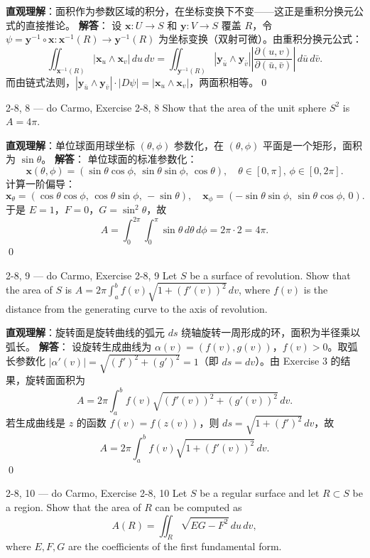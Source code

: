 \begin{solution}
\textbf{直观理解}：面积作为参数区域的积分，在坐标变换下不变——这正是重积分换元公式的直接推论。
\textbf{解答}：
设 $\mathbf{x}: U \to S$ 和 $\mathbf{y}: V \to S$ 覆盖 $R$，令 $\psi = \mathbf{y}^{-1} \circ \mathbf{x}: \mathbf{x}^{-1}(R) \to \mathbf{y}^{-1}(R)$ 为坐标变换（双射可微）。由重积分换元公式：
\[
\iint_{\mathbf{x}^{-1}(R)} |\mathbf{x}_u \wedge \mathbf{x}_v| \, du \, dv = \iint_{\mathbf{y}^{-1}(R)} |\mathbf{y}_{\bar{u}} \wedge \mathbf{y}_{\bar{v}}| \left|\frac{\partial(u,v)}{\partial(\bar{u},\bar{v})}\right| \, d\bar{u} \, d\bar{v}.
\]
而由链式法则，$|\mathbf{y}_{\bar{u}} \wedge \mathbf{y}_{\bar{v}}| \cdot |D\psi| = |\mathbf{x}_u \wedge \mathbf{x}_v|$，两面积相等。\qed
\end{solution}
\begin{exercise}
{2-8, 8 — do Carmo, Exercise 2-8, 8}
Show that the area of the unit sphere $S^2$ is $A = 4\pi$.


\end{exercise}

\begin{solution}
\textbf{直观理解}：单位球面用球坐标 $(\theta, \phi)$ 参数化，在 $(\theta, \phi)$ 平面是一个矩形，面积为 $\sin\theta$。
\textbf{解答}：
单位球面的标准参数化：
\[
\mathbf{x}(\theta, \phi) = (\sin\theta\cos\phi, \, \sin\theta\sin\phi, \, \cos\theta), \quad \theta \in [0,\pi], \, \phi \in [0,2\pi].
\]
计算一阶偏导：
\[
\mathbf{x}_\theta = (\cos\theta\cos\phi, \, \cos\theta\sin\phi, \, -\sin\theta), \quad \mathbf{x}_\phi = (-\sin\theta\sin\phi, \, \sin\theta\cos\phi, \, 0).
\]
于是 $E = 1$，$F = 0$，$G = \sin^2\theta$，故
\[
A = \int_0^{2\pi} \int_0^\pi \sin\theta \, d\theta \, d\phi = 2\pi \cdot 2 = 4\pi.
\]
\qed
\end{solution}
\begin{exercise}
{2-8, 9 — do Carmo, Exercise 2-8, 9}
Let $S$ be a surface of revolution. Show that the area of $S$ is $A = 2\pi \int_a^b f(v) \sqrt{1 + (f'(v))^2} \, dv$, where $f(v)$ is the distance from the generating curve to the axis of revolution.


\end{exercise}

\begin{solution}
\textbf{直观理解}：旋转面是旋转曲线的弧元 $ds$ 绕轴旋转一周形成的环，面积为半径乘以弧长。
\textbf{解答}：
设旋转生成曲线为 $\alpha(v) = (f(v), g(v))$，$f(v) > 0$。取弧长参数化 $|\alpha'(v)| = \sqrt{(f')^2 + (g')^2} = 1$（即 $ds = dv$）。由 Exercise 3 的结果，旋转面面积为
\[
A = 2\pi \int_a^b f(v) \sqrt{(f'(v))^2 + (g'(v))^2} \, dv.
\]
若生成曲线是 $z$ 的函数 $f(v) = f(z(v))$，则 $ds = \sqrt{1+(f')^2} \, dv$，故
\[
A = 2\pi \int_a^b f(v) \sqrt{1 + (f'(v))^2} \, dv.
\]
\qed
\end{solution}
\begin{exercise}
{2-8, 10 — do Carmo, Exercise 2-8, 10}
Let $S$ be a regular surface and let $R \subset S$ be a region. Show that the area of $R$ can be computed as
\[
A(R) = \iint_R \sqrt{EG - F^2} \, du \, dv,
\]
where $E, F, G$ are the coefficients of the first fundamental form.


\end{exercise}

